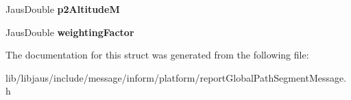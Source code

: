 \begin{DoxyCompactItemize}
\item 
\hypertarget{struct_report_global_path_segment_message_struct_a69ac57e29bfb3c1625cc4e09e212f9a8}{\-Jaus\-Double {\bfseries p2\-Altitude\-M}}\label{struct_report_global_path_segment_message_struct_a69ac57e29bfb3c1625cc4e09e212f9a8}

\item 
\hypertarget{struct_report_global_path_segment_message_struct_af51bb9665680af3dddb0c35ad68a146e}{\-Jaus\-Double {\bfseries weighting\-Factor}}\label{struct_report_global_path_segment_message_struct_af51bb9665680af3dddb0c35ad68a146e}

\end{DoxyCompactItemize}


\-The documentation for this struct was generated from the following file\-:\begin{DoxyCompactItemize}
\item 
lib/libjaus/include/message/inform/platform/report\-Global\-Path\-Segment\-Message.\-h\end{DoxyCompactItemize}
